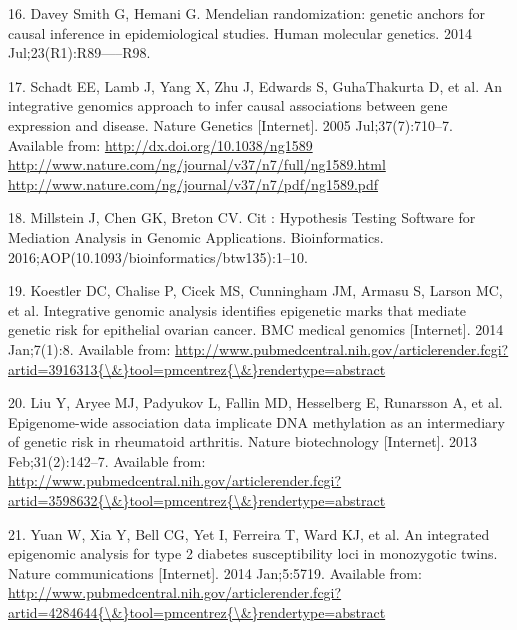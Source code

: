 \documentclass[]{article}
\begin{document}
\hypertarget{ref-DaveySmithHemani2014}{}
16. Davey Smith G, Hemani G. Mendelian randomization: genetic anchors
for causal inference in epidemiological studies. Human molecular
genetics. 2014 Jul;23(R1):R89-----R98.

\hypertarget{ref-Schadt2005}{}
17. Schadt EE, Lamb J, Yang X, Zhu J, Edwards S, GuhaThakurta D, et al.
An integrative genomics approach to infer causal associations between
gene expression and disease. Nature Genetics {[}Internet{]}. 2005
Jul;37(7):710--7. Available from:
\href{http://dx.doi.org/10.1038/ng1589\%20http://www.nature.com/ng/journal/v37/n7/full/ng1589.html\%20http://www.nature.com/ng/journal/v37/n7/pdf/ng1589.pdf}{http://dx.doi.org/10.1038/ng1589 http://www.nature.com/ng/journal/v37/n7/full/ng1589.html http://www.nature.com/ng/journal/v37/n7/pdf/ng1589.pdf}

\hypertarget{ref-Millstein2016}{}
18. Millstein J, Chen GK, Breton CV. Cit : Hypothesis Testing Software
for Mediation Analysis in Genomic Applications. Bioinformatics.
2016;AOP(10.1093/bioinformatics/btw135):1--10.

\hypertarget{ref-Koestler2014}{}
19. Koestler DC, Chalise P, Cicek MS, Cunningham JM, Armasu S, Larson
MC, et al. Integrative genomic analysis identifies epigenetic marks that
mediate genetic risk for epithelial ovarian cancer. BMC medical genomics
{[}Internet{]}. 2014 Jan;7(1):8. Available from:
\href{http://www.pubmedcentral.nih.gov/articlerender.fcgi?artid=3916313\%7B/\&\%7Dtool=pmcentrez\%7B/\&\%7Drendertype=abstract}{http://www.pubmedcentral.nih.gov/articlerender.fcgi?artid=3916313\{\textbackslash{}\&\}tool=pmcentrez\{\textbackslash{}\&\}rendertype=abstract}

\hypertarget{ref-Liu2013}{}
20. Liu Y, Aryee MJ, Padyukov L, Fallin MD, Hesselberg E, Runarsson A,
et al. Epigenome-wide association data implicate DNA methylation as an
intermediary of genetic risk in rheumatoid arthritis. Nature
biotechnology {[}Internet{]}. 2013 Feb;31(2):142--7. Available from:
\href{http://www.pubmedcentral.nih.gov/articlerender.fcgi?artid=3598632\%7B/\&\%7Dtool=pmcentrez\%7B/\&\%7Drendertype=abstract}{http://www.pubmedcentral.nih.gov/articlerender.fcgi?artid=3598632\{\textbackslash{}\&\}tool=pmcentrez\{\textbackslash{}\&\}rendertype=abstract}

\hypertarget{ref-Yuan2014}{}
21. Yuan W, Xia Y, Bell CG, Yet I, Ferreira T, Ward KJ, et al. An
integrated epigenomic analysis for type 2 diabetes susceptibility loci
in monozygotic twins. Nature communications {[}Internet{]}. 2014
Jan;5:5719. Available from:
\href{http://www.pubmedcentral.nih.gov/articlerender.fcgi?artid=4284644\%7B/\&\%7Dtool=pmcentrez\%7B/\&\%7Drendertype=abstract}{http://www.pubmedcentral.nih.gov/articlerender.fcgi?artid=4284644\{\textbackslash{}\&\}tool=pmcentrez\{\textbackslash{}\&\}rendertype=abstract}
\end{document}
